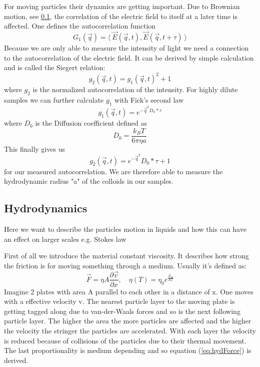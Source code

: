 \documentclass[]{article}
\begin{document}
For moving particles their dynamics are getting important. Due to Brownian motion, see \ref{hyd}, the correlation of the electric field to itself at a later time is affected. One defines the autocorrelation function 
\begin{equation}\label{eq:g1}
G_1(\vec{q}) = \langle \: \vec{E}(\vec{q},t),\vec{E}(\vec{q},t+\tau) \: \rangle
\end{equation} 
Because we are only able to measure the intensity of light we need a connection to the autocorrelation of the electric field. It can be derived by simple calculation and is called the Siegert relation:
\begin{equation}\label{eq:siegert}
g_2(\vec{q},t) = g_1(\vec{q},t )^2 +1
\end{equation}
where $g_2$ is the normalized autocorrelation of the intensity. For highly dilute samples we can further calculate $g_1$ with Fick's second law
\begin{equation}\label{eq:g1solved}
g_1(\vec{q},t )=e^{-\vec{q}^{2}D_0*\tau}
\end{equation}
where $D_0$ is the Diffusion coefficient defined as 
\begin{equation}\label{eq:StokesEinstein}
D_0=\frac{k_BT}{6\pi \eta a}
\end{equation}
This finally gives us 
\begin{equation}\label{eq:g2}
\boxed{g_2(\vec{q},t) =e^{- \vec{q}^{2}}D_0*\tau+1}
\end{equation}
for our measured autocorrelation. We are therefore able to measure the hydrodynamic radius "a" of the colloids in our samples.


\subsection{Hydrodynamics}
\label{hyd}
Here we want to describe the particles motion in liquids and how this can have an effect on larger scales e.g. Stokes law

First of all we introduce the material constant viscosity. It describes how strong the friction is for moving something through a medium. Usually it's defined as: 
\begin{equation}\label{eq:hydForce}
\vec{F}=\eta A \frac{\partial \vec{v}}{\partial x} , \quad \eta(T)= \eta_0 e^{\frac{E_A}{RT}}
\end{equation}
Imagine 2 plates with area A parallel to each other in a distance of x. One moves with a effective velocity v. The nearest particle layer  to the moving plate is getting tagged along due to van-der-Waals forces and so is the next following particle layer. The higher the area the more particles are affected and the higher the velocity the stringer the particles are accelerated. With each layer the velocity is reduced because of collisions of the particles due to their thermal movement. The last proportionality is medium depending and so equation (\ref{eq:hydForce}) is derived.
\end{document}
